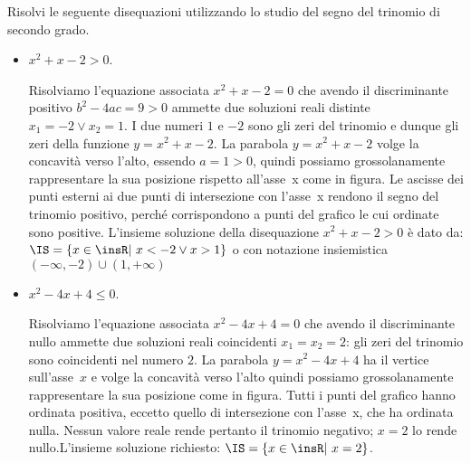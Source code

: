 \begin{esempio}
Risolvi le seguente disequazioni utilizzando lo studio del segno del trinomio 
di secondo grado.



\begin{comment}
\begin{minipage}{.49\linewidth}
 
\end{minipage}
\hfill
\begin{minipage}{.49\linewidth}
 
\end{minipage}
\end{comment}

\begin{itemize}
\item \(x^2+x-2>0\).

\begin{minipage}{.76\linewidth}
 Risolviamo l'equazione associata \(x^2+x-2=0\) che avendo il discriminante 
positivo \(b^2-4ac=9>0\) ammette due soluzioni reali distinte \(x_1=-2\vee 
x_2=1\). 
I due numeri \(1\) e \(-2\) sono gli zeri del trinomio e dunque gli zeri della 
funzione \(y=x^2+x-2\). La parabola \(y=x^2+x-2\) volge la concavità verso 
l'alto, 
essendo \(a=1>0\), quindi possiamo grossolanamente rappresentare la sua 
posizione rispetto all'asse~x come in figura.
Le ascisse dei punti esterni ai due punti di intersezione con l'asse~x 
rendono il segno del trinomio positivo, perché corrispondono a punti del 
grafico le cui ordinate sono positive. 
L'insieme soluzione della disequazione 
\(x^2+x-2>0\) è dato da: \(\IS=\{x\in \insR\text{{\textbar} }x<-2\vee x>1\}\) o 
con 
notazione insiemistica \((-\infty,-2)\cup (1,+\infty )\)
\end{minipage}
\hfill
\begin{minipage}{.22\linewidth}
 \parabolaa
\end{minipage}

\item \(x^2-4x+4\le 0\).

\begin{minipage}{.76\linewidth}
Risolviamo l'equazione associata \(x^2-4x+4=0\) che avendo il discriminante 
nullo 
ammette due soluzioni reali coincidenti \(x_1=x_2=2\): gli zeri del trinomio 
sono 
coincidenti nel numero \(2\). 
La parabola \(y=x^2-4x+4\) ha il vertice sull'asse~\(x\) 
e volge la concavità verso l'alto quindi possiamo grossolanamente 
rappresentare 
la sua posizione come in figura.
Tutti i punti del grafico hanno ordinata positiva, eccetto 
quello di intersezione con l'asse~x, che ha ordinata nulla. Nessun valore 
reale rende pertanto il trinomio negativo; \(x=2\) lo rende nullo.L'insieme 
soluzione richiesto: \(\IS=\{x\in \insR\text{{\textbar} }x=2\}\).
\end{minipage}
\hfill
\begin{minipage}{.22\linewidth}
 \parabolab
\end{minipage}


\end{itemize}
\end{esempio}

